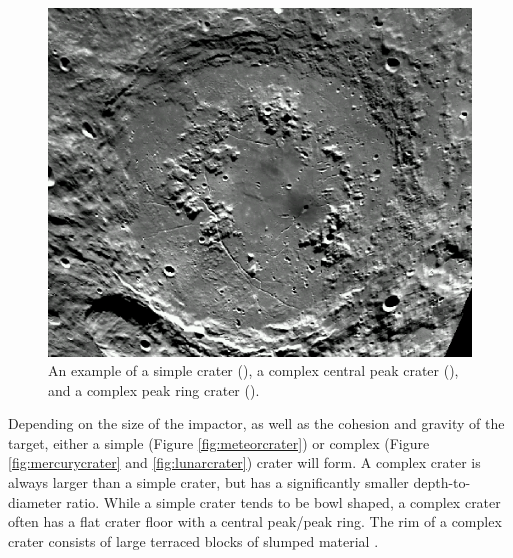 \begin{figure}[!t]
\begin{minipage}[t]{0.32\linewidth}
\end{minipage}\hspace*{\fill}
\begin{minipage}[t]{0.32\linewidth}
\centering
\includegraphics[width=\linewidth]{images/schrodinger.png}
\end{minipage}
\caption{An example of a simple crater (\protect{}), a  complex central peak crater (\protect{}), and a complex peak ring crater (\protect{}). \label{fig:simplecomplex}}
\end{figure}

Depending on the size of the impactor, as well as the cohesion and gravity of the target, either a simple (Figure \ref{fig:meteorcrater}) or complex (Figure \ref{fig:mercurycrater} and \ref{fig:lunarcrater}) crater will form. A complex crater is always larger than a simple crater, but has a significantly smaller depth-to-diameter ratio. While a simple crater tends to be bowl shaped, a complex crater often has a flat crater floor with a central peak/peak ring. The rim of a complex crater consists of large terraced blocks of slumped material \citep{osinski2012impact}.


